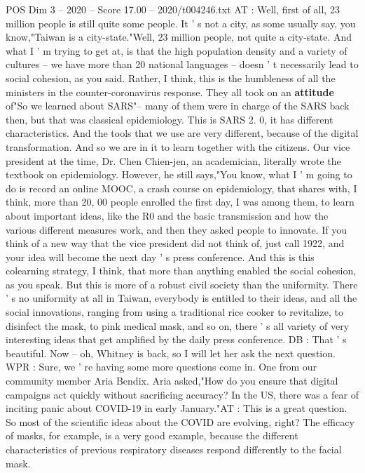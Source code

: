 \begin{textsample}{POS Dim 3 – 2020 – Score 17.00 – 2020/t004246.txt}
AT : Well, first of all, 23 million people is still quite some people.
It ' s not a city, as some usually say, you know,"Taiwan is a city-state."Well, 23 million people, not quite a city-state.
And what I ' m trying to get at, is that the high population density and a variety of cultures -- we have more than 20 national languages -- doesn ' t necessarily lead to social cohesion, as you said.
Rather, I think, this is the humbleness of all the ministers in the counter-coronavirus response.
They all took on an \textbf{attitude} of"So we learned about SARS"-- many of them were in charge of the SARS back then, but that was classical epidemiology.
This is SARS 2. 0, it has different characteristics.
And the tools that we use are very different, because of the digital transformation.
And so we are in it to learn together with the citizens.
Our vice president at the time, Dr.
Chen Chien-jen, an academician, literally wrote the textbook on epidemiology.
However, he still says,"You know, what I ' m going to do is record an online MOOC, a crash course on epidemiology, that shares with, I think, more than 20, 00 people enrolled the first day, I was among them, to learn about important ideas, like the R0 and the basic transmission and how the various different measures work, and then they asked people to innovate.
If you think of a new way that the vice president did not think of, just call 1922, and your idea will become the next day ' s press conference.
And this is this colearning strategy, I think, that more than anything enabled the social cohesion, as you speak.
But this is more of a robust civil society than the uniformity.
There ' s no uniformity at all in Taiwan, everybody is entitled to their ideas, and all the social innovations, ranging from using a traditional rice cooker to revitalize, to disinfect the mask, to pink medical mask, and so on, there ' s all variety of very interesting ideas that get amplified by the daily press conference.
DB : That ' s beautiful.
Now -- oh, Whitney is back, so I will let her ask the next question.
WPR : Sure, we ' re having some more questions come in.
One from our community member Aria Bendix.
Aria asked,"How do you ensure that digital campaigns act quickly without sacrificing accuracy?
In the US, there was a fear of inciting panic about COVID-19 in early January."AT : This is a great question.
So most of the scientific ideas about the COVID are evolving, right?
The efficacy of masks, for example, is a very good example, because the different characteristics of previous respiratory diseases respond differently to the facial mask.

\end{textsample}
